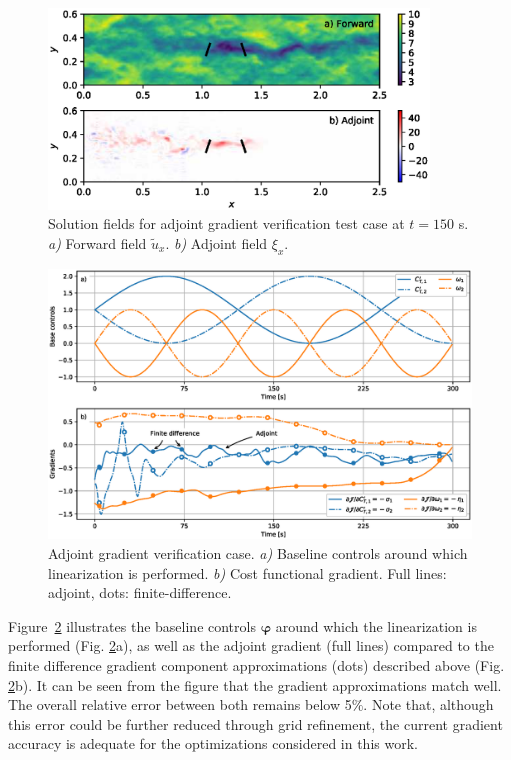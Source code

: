 \documentclass[energies,article,submit,moreauthors,latex,10pt,a4paper]{mdpi}
\newcommand{\bs}[1]{\boldsymbol{#1}}
\begin{document}
\begin{figure}[ht]
	\centering
	\includegraphics[width=0.9\textwidth]{figure18}
	\caption{Solution fields for adjoint gradient verification test case at $t=150$ s. \emph{a)} Forward field $\tilde{u}_x$. \emph{b)} Adjoint field $\xi_x$. \label{fig:forwardfield_adjointfield}}
\end{figure}

\begin{figure}[h!]
	\includegraphics[width=\textwidth]{figure19}
	\caption{Adjoint gradient verification case. \emph{a)} Baseline controls around which linearization is performed. \emph{b)} Cost functional gradient. Full lines: adjoint, dots: finite-difference. \label{fig:gradient_verification}}
\end{figure}

Figure~\ref{fig:gradient_verification} illustrates the baseline controls $\bs{\varphi}$ around which the linearization is performed (Fig. \ref{fig:gradient_verification}a), as well as the adjoint gradient (full lines) compared to the finite difference gradient component approximations (dots) described above (Fig. \ref{fig:gradient_verification}b). It can be seen from the figure that the gradient approximations match well. The overall relative error between both remains below 5$\%$. Note that, although this error could be further reduced through grid refinement, the current gradient accuracy is adequate for the optimizations considered in this work.
\end{document}
